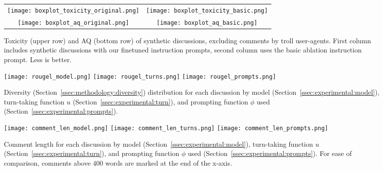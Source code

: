 \begin{figure}[t]
    \centering
    \begin{tabular}{cc}
            \texttt{[image: boxplot\_toxicity\_original.png]} &
            \texttt{[image: boxplot\_toxicity\_basic.png]} \\ 
            \texttt{[image: boxplot\_aq\_original.png]} &        
            \texttt{[image: boxplot\_aq\_basic.png]}
    \end{tabular}
    \caption{Toxicity (upper row) and \ac{AQ} (bottom row) of synthetic discussions, excluding comments by troll user-agents. First column includes synthetic discussions with our finetuned instruction prompts, second column uses the basic ablation instruction prompt. Less is better.}
    \label{fig::boxplots}
\end{figure}

\begin{figure*}[t]
    \texttt{[image: rougel\_model.png]} \hfill
    \texttt{[image: rougel\_turns.png]}
    \hfill
    \texttt{[image: rougel\_prompts.png]}
	\centering
	\caption{Diversity (Section~\ref{ssec:methodology:diversity}) distribution for each discussion by model (Section~\ref{ssec:experimental:model}), turn-taking function $u$ (Section~\ref{ssec:experimental:turn}), and prompting function $\phi$ used (Section~\ref{ssec:experimental:prompts}).}
	\label{fig::diversity}
\end{figure*}

\begin{figure*}[t]
    \texttt{[image: comment\_len\_model.png]} \hfill
    \texttt{[image: comment\_len\_turns.png]}
    \hfill
    \texttt{[image: comment\_len\_prompts.png]}
	\centering
	\caption{Comment length for each discussion by model (Section~\ref{ssec:experimental:model}), turn-taking function $u$ (Section~\ref{ssec:experimental:turn}), and prompting function $\phi$ used (Section~\ref{ssec:experimental:prompts}). For ease of comparison, comments above $400$ words are marked at the end of the x-axis.}
	\label{fig::comment_length}
\end{figure*}



